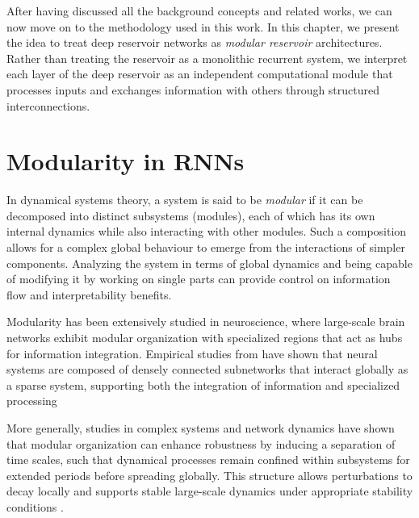 \label{chap:methodology}
After having discussed all the background concepts and related works, we can now move on to the methodology used in this work.
In this chapter, we present the idea to treat deep reservoir networks as \emph{modular reservoir} architectures. 
Rather than treating the reservoir as a monolithic recurrent system, we interpret each layer of the deep reservoir as an independent computational module that processes inputs and exchanges information with others through structured interconnections.

\section{Modularity in RNNs}
\label{sec:method:modularity}
In dynamical systems theory, a system is said to be \emph{modular} if it can be decomposed into distinct 
subsystems (modules), each of which has its own internal dynamics while also interacting with other modules.
Such a composition allows for a complex global behaviour to emerge from the interactions of simpler components.
Analyzing the system in terms of global dynamics and being capable of modifying it by working on single parts can provide control on information flow and interpretability benefits.

Modularity has been extensively studied in neuroscience, where large-scale brain networks exhibit modular organization with specialized regions that act as hubs for information integration.
Empirical studies from \cite{bullmore2009complex} have shown that neural systems are composed of densely connected subnetworks that interact globally as a sparse system, supporting
both the integration of information and specialized processing 

More generally, studies in complex systems and network dynamics have shown that modular organization 
can enhance robustness by inducing a separation of time scales, such that dynamical processes remain
 confined within subsystems for extended periods before spreading globally. 
 This structure allows perturbations to decay locally and supports stable large-scale 
 dynamics under appropriate stability conditions \cite{Lambiotte_Schaub_2022}.

